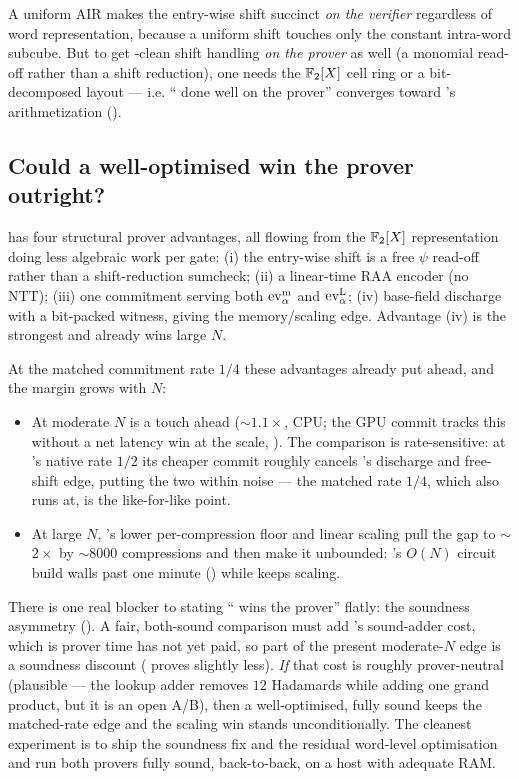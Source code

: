 \begin{remark}
A uniform AIR makes the entry-wise shift succinct \emph{on the verifier}
regardless of word representation, because a uniform shift touches only
the constant intra-word subcube. But to get \zinc{}-clean shift handling
\emph{on the prover} as well (a monomial read-off rather than a shift
reduction), one needs the $\mathbb{F}_2[X]$ cell ring or a bit-decomposed layout
--- i.e. ``\binius{} done well on the prover'' converges toward \zinc{}'s
arithmetization ().
\end{remark}

\subsection{Could a well-optimised \zinc{} win the prover outright?}
\label{sec:ana-prover}

\zinc{} has four structural prover advantages, all flowing from the
$\mathbb{F}_2[X]$ representation doing less algebraic work per gate: (i) the
entry-wise shift is a free $\psi$ read-off rather than a shift-reduction
sumcheck; (ii) a linear-time RAA encoder (no NTT); (iii) one commitment
serving both $\operatorname{ev}^{\mathrm{m}}_{\alpha}$ and $\operatorname{ev}^{\mathrm{L}}_{\alpha}$; (iv) base-field discharge with a
bit-packed witness, giving the memory/scaling edge. Advantage (iv) is the
strongest and already wins large $N$.

At the matched commitment rate $1/4$ these advantages already put \zinc{}
ahead, and the margin grows with $N$:
\begin{itemize}
  \item At moderate $N$ \zinc{} is a touch ahead ($\sim$$1.1\times$, CPU;
  the GPU commit tracks this without a net latency win at the scale,
  ). The comparison is rate-sensitive: at \binius{}'s
  native rate $1/2$ its cheaper commit roughly cancels \zinc{}'s discharge
  and free-shift edge, putting the two within noise --- the matched rate
  $1/4$, which \zinc{} also runs at, is the like-for-like point.
  \item At large $N$, \zinc{}'s lower per-compression floor and linear
  scaling pull the gap to $\sim$$2\times$ by $\sim$$8000$ compressions and
  then make it unbounded: \binius{}'s $O(N)$ circuit build walls past one
  minute () while \zinc{} keeps scaling.
\end{itemize}
There is one real blocker to stating ``\zinc{} wins the prover'' flatly:
the soundness asymmetry (). A fair, both-sound
comparison must add \zinc{}'s sound-adder cost, which is prover time
\zinc{} has not yet paid, so part of the present moderate-$N$ edge is a
soundness discount (\zinc{} proves slightly less). \emph{If} that cost is
roughly prover-neutral (plausible --- the lookup adder removes $12$
Hadamards while adding one grand product, but it is an open A/B), then a
well-optimised, fully sound \zinc{} keeps the matched-rate edge and the
scaling win stands unconditionally. The cleanest experiment is to ship the
soundness fix and the residual word-level optimisation and run both
provers fully sound, back-to-back, on a host with adequate RAM.
